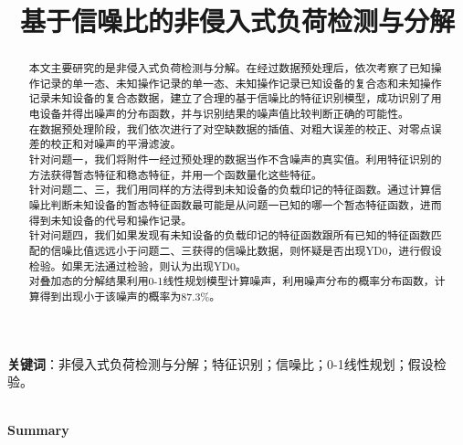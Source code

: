 \documentclass[UTF8]{article}
\title{\textbf{基于信噪比的非侵入式负荷检测与分解}}
\author{}
\date{}
\begin{document}
\maketitle
\begin{abstract}
本文主要研究的是非侵入式负荷检测与分解。在经过数据预处理后，依次考察了已知操作记录的单一态、未知操作记录的单一态、未知操作记录已知设备的复合态和未知操作记录未知设备的复合态数据，建立了合理的基于信噪比的特征识别模型，成功识别了用电设备并得出噪声的分布函数，并与识别结果的噪声值比较判断正确的可能性。\\
\indent 在数据预处理阶段，我们依次进行了对空缺数据的插值、对粗大误差的校正、对零点误差的校正和对噪声的平滑滤波。\\
\indent 针对问题一，我们将附件一经过预处理的数据当作不含噪声的真实值。利用特征识别的方法获得暂态特征和稳态特征，并用一个函数量化这些特征。\\
\indent 针对问题二、三，我们用同样的方法得到未知设备的负载印记的特征函数。通过计算信噪比判断未知设备的暂态特征函数最可能是从问题一已知的哪一个暂态特征函数，进而得到未知设备的代号和操作记录。\\
\indent 针对问题四，我们如果发现有未知设备的负载印记的特征函数跟所有已知的特征函数匹配的信噪比值远远小于问题二、三获得的信噪比数据，则怀疑是否出现YD0，进行假设检验。如果无法通过检验，则认为出现YD0。\\
\indent 对叠加态的分解结果利用0-1线性规划模型计算噪声，利用噪声分布的概率分布函数，计算得到出现小于该噪声的概率为87.3\%。\\
\end{abstract}
\textbf{关键词}：非侵入式负荷检测与分解；特征识别；信噪比；0-1线性规划；假设检验。

\newpage
\thispagestyle{empty}
\begin{center}
\Large
\textbf{}\\
\normalsize
\textbf{Summary}
\end{center}
\small
\end{document}
